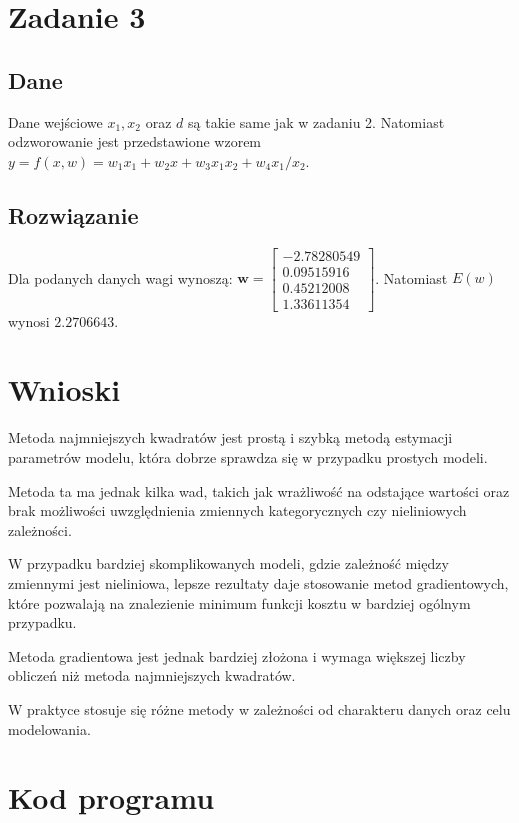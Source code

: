 \documentclass{article}
\begin{document}
\section{Zadanie 3}
\subsection{Dane}
Dane wejściowe $x_1, x_2$ oraz $d$ są takie same jak w zadaniu 2.
Natomiast odzworowanie jest przedstawione wzorem $y = f(x, w) = w_1x_1 + w_2x + w_3x_1x_2 + w_4x_1/x_2$.

\subsection{Rozwiązanie}

Dla podanych danych wagi wynoszą:
$
\textbf{w} = 
    \begin{bmatrix}
        -2.78280549 \\  0.09515916 \\  0.45212008 \\  1.33611354
    \end{bmatrix} 
$.
Natomiast $E(w)$ wynosi $2.2706643$.

\section{Wnioski}
Metoda najmniejszych kwadratów jest prostą i szybką metodą 
estymacji parametrów modelu, która dobrze sprawdza się w 
przypadku prostych modeli.

Metoda ta ma jednak kilka wad, takich jak wrażliwość 
na odstające wartości oraz brak możliwości uwzględnienia 
zmiennych kategorycznych czy nieliniowych zależności.

W przypadku bardziej skomplikowanych modeli, gdzie zależność 
między zmiennymi jest nieliniowa, lepsze rezultaty daje 
stosowanie metod gradientowych, które pozwalają na znalezienie 
minimum funkcji kosztu w bardziej ogólnym przypadku.

Metoda gradientowa jest jednak bardziej złożona i wymaga 
większej liczby obliczeń niż metoda najmniejszych kwadratów.

W praktyce stosuje się różne metody w zależności od charakteru 
danych oraz celu modelowania.


\section{Kod programu}

\end{document}
